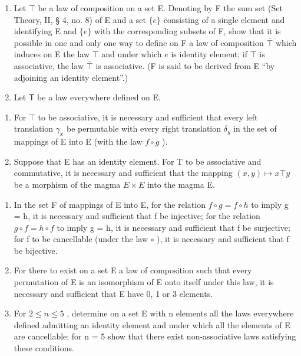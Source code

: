 \BourbakiExercisesSection

\begin{enumerate}
\def\labelenumi{\arabic{enumi}.}
\item
  Let \(\top\) be a law of composition on a set E. Denoting by F the sum set (Set Theory, II, § 4, no. 8) of E and a set \(\{e\}\) consisting of a single element and identifying E and \(\{e\}\) with the corresponding subsets of F, show that it is possible in one and only one way to define on F a law of composition \(\overline{\top}\) which induces on E the law \(\top\) and under which \(e\) is identity element; if \(\top\) is associative, the law \(\overline{\top}\) is associative. (F is said to be derived from E ``by adjoining an identity element''.)
\item
  Let \(\mathsf{T}\) be a law everywhere defined on E.
\end{enumerate}

\begin{enumerate}
\def\labelenumi{(\alph{enumi})}
\item
  For \(\top\) to be associative, it is necessary and sufficient that every left translation \(\gamma_{x}\) be permutable with every right translation \(\delta_{y}\) in the set of mappings of E into E (with the law \(f \circ g\) ).
\item
  Suppose that E has an identity element. For T to be associative and commutative, it is necessary and sufficient that the mapping \((x,y)\mapsto x\top y\) be a morphism of the magma \(E\times E\) into the magma E.
\end{enumerate}

\begin{enumerate}
\def\labelenumi{\arabic{enumi}.}
\setcounter{enumi}{2}
\item
  In the set F of mappings of E into E, for the relation \(f \circ g = f \circ h\) to imply g = h, it is necessary and sufficient that f be injective; for the relation \(g \circ f = h \circ f\) to imply g = h, it is necessary and sufficient that f be surjective; for f to be cancellable (under the law \(\circ\) ), it is necessary and sufficient that f be bijective.
\item
  For there to exist on a set E a law of composition such that every permutation of E is an isomorphism of E onto itself under this law, it is necessary and sufficient that E have 0, 1 or 3 elements.
\item
  For \(2 \leqslant n \leqslant 5\) , determine on a set E with n elements all the laws everywhere defined admitting an identity element and under which all the elements of E are cancellable; for n = 5 show that there exist non-associative laws satisfying these conditions.
\end{enumerate}

